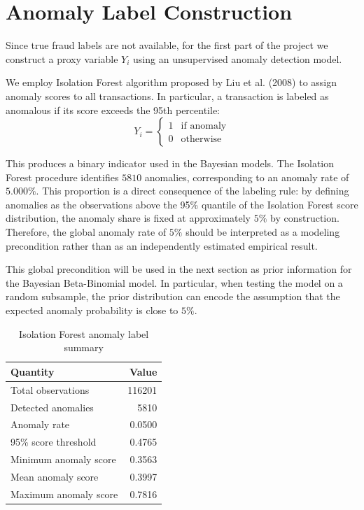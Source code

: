 \documentclass[a4paper,12pt]{article}
\begin{document}
\section{Anomaly Label Construction}
Since true fraud labels are not available, for the first part of the project we construct a proxy variable $Y_i$ using an unsupervised anomaly detection model.

We employ Isolation Forest algorithm proposed by Liu et al. (2008) to assign anomaly scores to all transactions. In particular, a transaction is labeled as anomalous if its score exceeds the 95th percentile:
\[
Y_i =
\begin{cases}
1 & \text{if anomaly} \\
0 & \text{otherwise}
\end{cases}
\]

This produces a binary indicator used in the Bayesian models. The Isolation Forest procedure identifies $5810$ anomalies, corresponding to an anomaly rate of $5.000\%$. 
This proportion is a direct consequence of the labeling rule: by defining anomalies as the observations above the 95\% quantile of the Isolation Forest score distribution, the anomaly share is fixed at approximately $5\%$ by construction. Therefore, the global anomaly rate of $5\%$ should be interpreted as a modeling precondition rather than as an independently estimated empirical result.

This global precondition will be used in the next section as prior information for the Bayesian Beta-Binomial model. In particular, when testing the model on a random subsample, the prior distribution can encode the assumption that the expected anomaly probability is close to $5\%$.

\begin{table}[H]
\centering
\begin{tabular}{lr}
\toprule
\textbf{Quantity} & \textbf{Value} \\
\midrule
Total observations & 116201 \\
Detected anomalies & 5810 \\
Anomaly rate & 0.0500 \\
95\% score threshold & 0.4765 \\
Minimum anomaly score & 0.3563 \\
Mean anomaly score & 0.3997 \\
Maximum anomaly score & 0.7816 \\
\bottomrule
\end{tabular}
\caption{Isolation Forest anomaly label summary}
\end{table}
\end{document}
